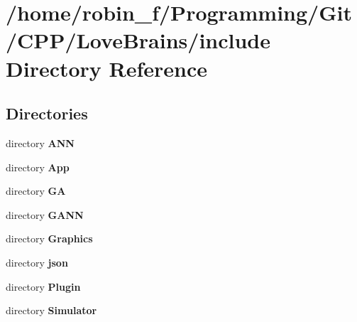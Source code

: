 \section{/home/robin\+\_\+f/\+Programming/\+Git/\+C\+P\+P/\+Love\+Brains/include Directory Reference}
\label{dir_5f23e146ec5fbcf9529add9297755970}
\subsection*{Directories}
\begin{DoxyCompactItemize}
\item 
directory {\bf A\+N\+N}
\item 
directory {\bf App}
\item 
directory {\bf G\+A}
\item 
directory {\bf G\+A\+N\+N}
\item 
directory {\bf Graphics}
\item 
directory {\bf json}
\item 
directory {\bf Plugin}
\item 
directory {\bf Simulator}
\end{DoxyCompactItemize}
